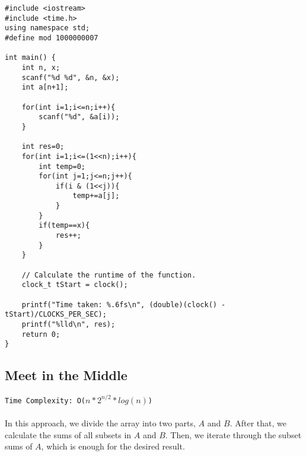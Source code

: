 \documentclass[12pt]{article}
\begin{document}
\begin{verbatim}
#include <iostream>
#include <time.h>
using namespace std;
#define mod 1000000007

int main() {
    int n, x;
    scanf("%d %d", &n, &x);
    int a[n+1];
    
    for(int i=1;i<=n;i++){
        scanf("%d", &a[i));
    }
    
    int res=0;
    for(int i=1;i<=(1<<n);i++){
        int temp=0;
        for(int j=1;j<=n;j++){
            if(i & (1<<j)){
                temp+=a[j];
            }
        }
        if(temp==x){
            res++;
        }
    }
    
    // Calculate the runtime of the function.
    clock_t tStart = clock();

    printf("Time taken: %.6fs\n", (double)(clock() - tStart)/CLOCKS_PER_SEC);
    printf("%lld\n", res);
    return 0;
}
\end{verbatim}
\clearpage


\subsection{Meet in the Middle }
\texttt{Time Complexity: O($n*2^{n/2}*log(n)$) } \\ \\
In this approach, we divide the array into two parts, $A$ and $B$. After that, we calculate the sums of all subsets in $A$ and $B$. Then, we iterate through the subset sums of $A$, which is enough for the desired result.
\end{document}
